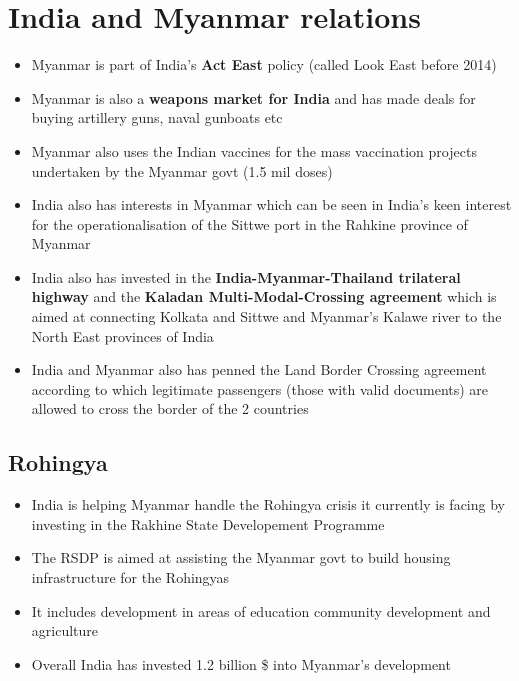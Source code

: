 \documentclass[11pt]{article}
\begin{document}
\section{India and Myanmar relations}
\label{sec:org81dedbd}
\begin{itemize}
\item Myanmar is part of India’s \textbf{Act East} policy (called Look East before 2014)
\item Myanmar is also a \textbf{weapons market for India} and has made deals for buying artillery guns, naval gunboats etc
\item Myanmar also uses the Indian vaccines for the mass vaccination projects undertaken by the Myanmar govt (1.5 mil doses)
\item India also has interests in Myanmar which can be seen in India's keen interest for the operationalisation of the Sittwe port in the Rahkine province of Myanmar
\item India also has invested in the \textbf{India-Myanmar-Thailand trilateral highway} and the \textbf{Kaladan Multi-Modal-Crossing agreement} which is aimed at connecting Kolkata and Sittwe and Myanmar's Kalawe river to the North East provinces of India
\item India and Myanmar also has penned the Land Border Crossing agreement according to which legitimate passengers (those with valid documents) are allowed to cross the border of the 2 countries
\end{itemize}

\subsection{Rohingya}
\label{sec:org4360b72}
\begin{itemize}
\item India is helping Myanmar handle the Rohingya crisis it currently is facing by investing in the Rakhine State Developement Programme
\item The RSDP is aimed at assisting the Myanmar govt to build housing infrastructure for the Rohingyas
\item It includes development in areas of education community development and agriculture

\item Overall India has invested 1.2 billion \$ into Myanmar’s development
\end{itemize}
\end{document}
